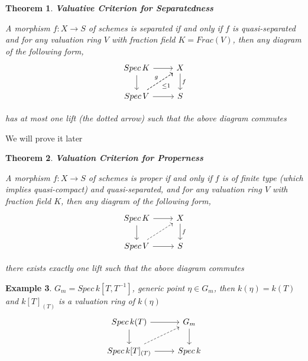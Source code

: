 \documentclass{article}
\newtheorem{theorem}{Theorem}[section]
\newtheorem{example}[theorem]{Example}
\begin{document}
\begin{theorem}
\textbf{Valuative Criterion for Separatedness}

A morphism $f : X \to S$ of schemes is separated if and only if $f$ is quasi-separated and for any valuation ring $V$ with fraction field $K=Frac(V)$, then any
diagram of the following form,
\[\begin{tikzcd}
	{Spec\,K} & X \\
	{Spec\,V} & S
	\arrow[from=2-1, to=2-2]
	\arrow["f", from=1-2, to=2-2]
	\arrow[from=1-1, to=2-1]
	\arrow[from=1-1, to=1-2]
	\arrow["g", dashed, from=2-1, to=1-2]
	\arrow["{\leq 1}"', dashed, from=2-1, to=1-2]
\end{tikzcd}\]

has at most one lift (the dotted arrow) such that the above diagram commutes
\end{theorem}

We will prove it later

\begin{theorem}
\textbf{Valuation Criterion for Properness}

A morphism $f : X \to S$ of schemes is proper if
and only if $f$ is of finite type (which implies quasi-compact) and quasi-separated, and for any valuation
ring $V$ with fraction field $K$, then any diagram of the following form,
\[\begin{tikzcd}
	{Spec\,K} & X \\
	{Spec\,V} & S
	\arrow[from=2-1, to=2-2]
	\arrow["f", from=1-2, to=2-2]
	\arrow[from=1-1, to=2-1]
	\arrow[from=1-1, to=1-2]
	\arrow[dashed, from=2-1, to=1-2]
\end{tikzcd}\]

there exists exactly one lift such that the above diagram commutes
\label{Thm 3.184}
\end{theorem}



\begin{example}
$G_m=Spec\,k[T,T^{-1}]$, generic point $\eta\in G_m$, then $k(\eta)=k(T)$ and $k[T]_{(T)}$ is a valuation ring of $k(\eta)$
\[\begin{tikzcd}
	{Spec\,k(T)} & G_m \\
	{Spec\,k[T]_{(T)}} & Spec\,k
	\arrow[from=2-1, to=2-2]
	\arrow[from=1-2, to=2-2]
	\arrow[from=1-1, to=2-1]
	\arrow[from=1-1, to=1-2]
	\arrow[dashed, from=2-1, to=1-2]
\end{tikzcd}\]
\end{example}
\end{document}
